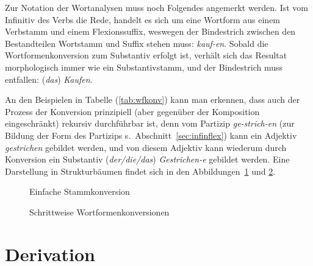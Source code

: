 Zur Notation der Wortanalysen muss noch Folgendes angemerkt werden.
Ist vom Infinitiv des Verbs die Rede, handelt es sich um eine Wortform aus einem Verbstamm und einem Flexionssuffix, weswegen der Bindestrich zwischen den Bestandteilen Wortstamm und Suffix stehen muss: \textit{kauf-en}.
Sobald die Wortformenkonversion zum Substantiv erfolgt ist, verhält sich das Resultat morphologisch immer wie ein Substantivstamm, und der Bindestrich muss entfallen: (\textit{das}) \textit{Kaufen}.

An den Beispielen in Tabelle (\ref{tab:wfkonv}) kann man erkennen, dass auch der Prozess der Konversion prinzipiell (aber gegenüber der Komposition eingeschränkt) rekursiv durchführbar ist, denn vom Partizip \textit{ge-strich-en} (zur Bildung der Form des Partizips s.\ Abschnitt~\ref{sec:infinflex}) kann ein Adjektiv \textit{gestrichen} gebildet werden, und von diesem Adjektiv kann wiederum durch Konversion ein Substantiv (\textit{der\slash die\slash das}) \textit{Gestrichen-e} gebildet werden.
Eine Darstellung in Strukturbäumen findet sich in den Abbildungen~\ref{fig:konv1} und \ref{fig:konv2}.

\begin{figure}[!h]
  \centering
  \caption{Einfache Stammkonversion}
  \label{fig:konv1}
\end{figure}

\begin{figure}[!h]
  \centering
  \caption{Schrittweise Wortformenkonversionen}
  \label{fig:konv2}
\end{figure}

\section{Derivation}

